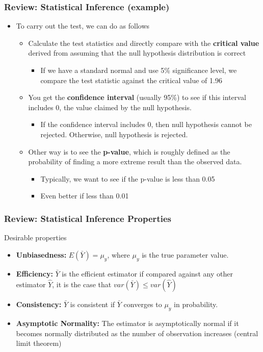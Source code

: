 \documentclass[compress]{beamer}
\begin{document}
\begin{frame}
\frametitle{Review: Statistical Inference (example)}
\begin{itemize}
\item To carry out the test, we can do as follows
\begin{itemize}
\item Calculate the test statistics and directly compare with the \textbf{critical value} derived from assuming that the null hypothesis distribution is correct
\begin{itemize}
\item If we have a standard normal and use 5\% significance level, we compare the test statistic against the critical value of 1.96
\end{itemize}
\item You get the \textbf{confidence interval} (usually 95\%) to see if this interval includes 0, the value claimed by the null hypothesis. 
\begin{itemize}
\item If the confidence interval includes 0, then null hypothesis cannot be rejected. Otherwise, null hypothesis is rejected.
\end{itemize}
\item Other way is to see the \textbf{p-value}, which is roughly defined as the probability of finding a more extreme result than the observed data.
\begin{itemize}
\item Typically, we want to see if the p-value is less than 0.05 
\item Even better if less than 0.01
\end{itemize}
\end{itemize}
\end{itemize}
\end{frame}

\begin{frame}
\frametitle{Review: Statistical Inference Properties}
Desirable properties
\begin{itemize}
\item \textbf{Unbiasedness:} $E(\bar{Y})=\mu_y$, where $\mu_y$ is the true parameter value.
\item \textbf{Efficiency:} $\bar{Y}$ is the efficient estimator if compared against any other estimator $\hat{Y}$, it is the case that $var(\bar{Y})\leq var(\hat{Y})$
\item \textbf{Consistency:} $\bar{Y}$ is consistent if $\bar{Y}$ converges to $\mu_y$ in probability.
\item \textbf{Asymptotic Normality:} The estimator is asymptotically normal if it becomes normally distributed as the number of observation increases (central limit theorem) 
\end{itemize}
\end{frame}
\end{document}
